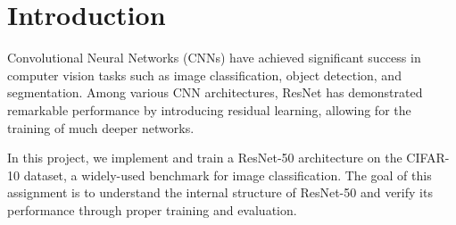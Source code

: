 \section{Introduction}
\label{sec:intro}

Convolutional Neural Networks (CNNs) have achieved significant success in computer vision tasks such as image classification, object detection, and segmentation. Among various CNN architectures, ResNet has demonstrated remarkable performance by introducing residual learning, allowing for the training of much deeper networks.

In this project, we implement and train a ResNet-50 architecture on the CIFAR-10 dataset, a widely-used benchmark for image classification. The goal of this assignment is to understand the internal structure of ResNet-50 and verify its performance through proper training and evaluation.


